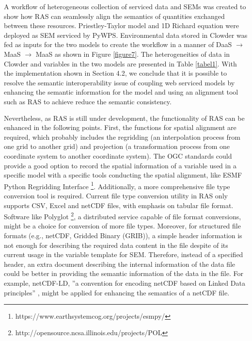 \documentclass[review]{elsarticle}
\begin{document}
A workflow of heterogeneous collection of serviced data and SEMs was created to show how RAS can seamlessly align the semantics of quantities exchanged between these resources. Priestley-Taylor model and 1D Richard equation were deployed as SEM serviced by PyWPS. Environmental data stored in Clowder was fed as inputs for the two models to create the workflow in a manner of DaaS $\rightarrow$ MaaS $\rightarrow$ MaaS as shown in Figure \ref{figure7}. The heterogeneities of data in Clowder and variables in the two models are presented in Table \ref{tabel1}. With the implementation shown in Section 4.2, we conclude that it is possible to resolve the semantic interoperability issue of coupling web serviced models by enhancing the semantic information for the model and using an alignment tool such as RAS to achieve reduce the semantic consistency. 

Nevertheless, as RAS is still under development, the functionality of RAS can be enhanced in the following points. First, the functions for spatial alignment are required, which probably includes the regridding (an interpolation process from one grid to another grid) and projection (a transformation process from one coordinate system to another coordinate system). The OGC standards could provide a good option to record the spatial information of a variable used in a specific model with a specific tools conducting the spatial alignment, like ESMF Python Regridding Interface \footnote{https://www.earthsystemcog.org/projects/esmpy/}. Additionally, a more comprehensive file type conversion tool is required. Current file type conversion utility in RAS only supports CSV, Excel and netCDF files, with emphasis on tabular file format. Software like Polyglot \footnote{http://opensource.ncsa.illinois.edu/projects/POL}, a distributed service capable of file format conversions, might be a choice for conversion of more file types. Moreover, for structured file formats (e.g., netCDF, Gridded Binary (GRIB)), a simple header information is not enough for describing the required data content in the file despite of its current usage in the variable template for SEM. Therefore, instead of a specified header, an extra document describing the internal information of the data file could be better in providing the semantic information of the data in the file. For example, netCDF-LD, ''a convention for encoding netCDF based on Linked Data principles'' \citep{yu2015}, might be applied for enhancing the semantics of a netCDF file. 
\end{document}

